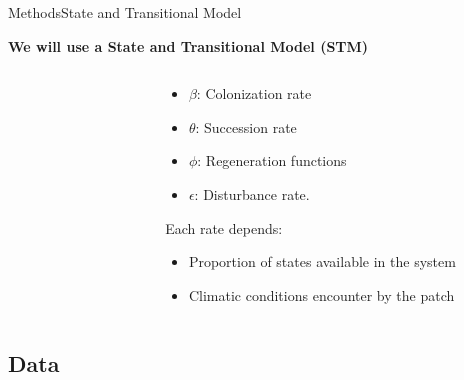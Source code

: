 \documentclass[table]{eecslides}
\begin{document}

\begin{frame}[t]{Methods}{State and Transitional Model}

\textbf{We will use a State and Transitional Model (STM)}
\vspace{-1.5em}
\begin{columns}[c]
	\begin{column}[c]{.40\paperwidth}
		\begin{figure}
			\small{}
		\end{figure}
	\end{column}
	\begin{column}[l]{.40\paperwidth}
	\begin{itemize}
		\item $\beta$: Colonization rate\\
		\item $\theta$: Succession rate\\
		\item $\phi$: Regeneration functions\\
		\item $\epsilon$: Disturbance rate.
	\end{itemize}
	\vspace{1em}
	Each rate depends:
		\begin{itemize}
			\item Proportion of states available in the system
			\item Climatic conditions encounter by the patch
		\end{itemize}
	\end{column}
\end{columns}

\end{frame}

%
%
%
%
%

\subsection{Data}
\end{document}
